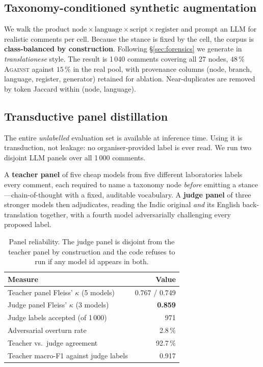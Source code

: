 \documentclass[twocolumn]{ceurart}
\begin{document}
\subsection{Taxonomy-conditioned synthetic augmentation}
\label{sec:synth}

We walk the product
$\text{node} \times \text{language} \times \text{script} \times \text{register}$
and prompt an LLM for realistic comments per cell. Because the stance is fixed
by the cell, the corpus is \textbf{class-balanced by construction}. Following
\S\ref{sec:forensics} we generate in \emph{translationese} style. The result is
1\,040 comments covering all 27 nodes, $48\,\%$ \textsc{Against} against
$15\,\%$ in the real pool, with provenance columns
(node, branch, language, register, generator) retained for ablation.
Near-duplicates are removed by token Jaccard within (node, language).

\subsection{Transductive panel distillation}
\label{sec:distil}

The entire \emph{unlabelled} evaluation set is available at inference time.
Using it is transduction, not leakage: no organiser-provided label is ever read.
We run two disjoint LLM panels over all 1\,000 comments.

A \textbf{teacher panel} of five cheap models from five different laboratories
labels every comment, each required to name a taxonomy node \emph{before}
emitting a stance---chain-of-thought with a fixed, auditable vocabulary. A
\textbf{judge panel} of three stronger models then adjudicates, reading the
Indic original \emph{and} its English back-translation together, with a fourth
model adversarially challenging every proposed label.

\begin{table}[t]
\centering
\caption{Panel reliability. The judge panel is disjoint from the teacher panel
by construction and the code refuses to run if any model id appears in both.}
\label{tab:panels}
\begin{tabular}{lr}
\toprule
Measure & Value \\
\midrule
Teacher panel Fleiss' $\kappa$ (5 models) & 0.767 / 0.749 \\
Judge panel Fleiss' $\kappa$ (3 models) & \textbf{0.859} \\
Judge labels accepted (of 1\,000) & 971 \\
Adversarial overturn rate & 2.8\,\% \\
Teacher vs.\ judge agreement & 92.7\,\% \\
Teacher macro-F1 against judge labels & 0.917 \\
\bottomrule
\end{tabular}
\end{table}
\end{document}

